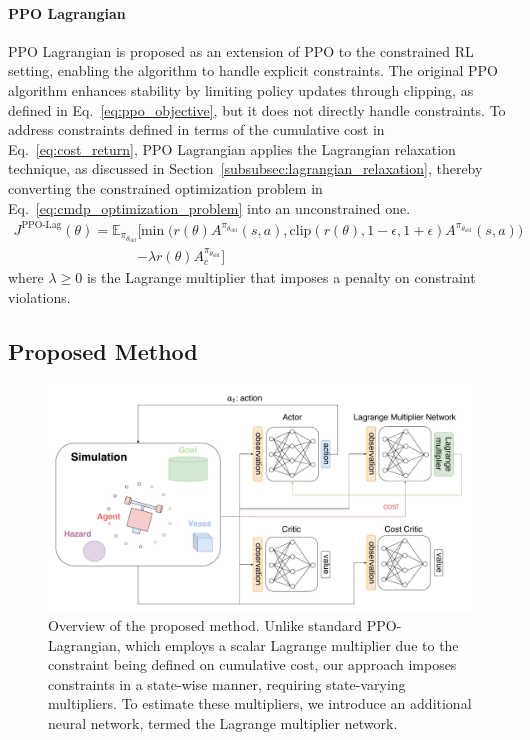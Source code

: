 \paragraph{\textbf{PPO Lagrangian}}

PPO Lagrangian is proposed as an extension of PPO to the constrained RL setting, enabling the algorithm to handle explicit constraints.
The original PPO algorithm enhances stability by limiting policy updates through clipping, as defined in Eq.~\ref{eq:ppo_objective}, but it does not directly handle constraints.
To address constraints defined in terms of the cumulative cost in Eq.~\ref{eq:cost_return}, PPO Lagrangian applies the Lagrangian relaxation technique, as discussed in Section~\ref{subsubsec:lagrangian_relaxation}, thereby converting the constrained optimization problem in Eq.~\ref{eq:cmdp_optimization_problem} into an unconstrained one.
\begin{equation} \label{eq:ppo_lagrangian_objective}
    \begin{aligned} J^{\text{PPO-Lag}}(\theta)
        = \mathbb{E}_{\pi_{\theta_\text{old}}} \Big[ &\min \big( r(\theta) A^{\pi_{\theta_\text{old}}}(s, a), \text{clip}(r(\theta), 1 - \epsilon, 1 + \epsilon) A^{\pi_{\theta_\text{old}}}(s, a) \big)
        \\ &- \lambda r(\theta) A^{\pi_{\theta_\text{old}}}_c \Big]
    \end{aligned}
\end{equation}
where $\lambda \geq 0$ is the Lagrange multiplier that imposes a penalty on constraint violations.



\subsection{Proposed Method}



\begin{figure}[h]
    \centering

    \includegraphics[width=0.8\linewidth]{figure/ppo_lagnet.pdf}
    \caption{Overview of the proposed method.
            Unlike standard PPO-Lagrangian, which employs a scalar Lagrange multiplier due to the constraint being defined on cumulative cost, our approach imposes constraints in a state-wise manner, requiring state-varying multipliers. 
            To estimate these multipliers, we introduce an additional neural network, termed the Lagrange multiplier network.}
    \label{fig:ppo_lagnet}
\end{figure}

